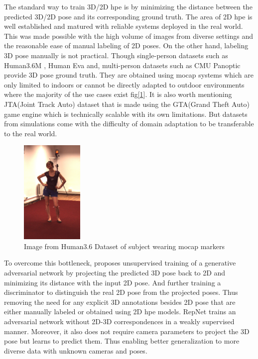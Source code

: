The standard way to train 3D/2D \ac{hpe} is by minimizing the distance between the predicted 3D/2D pose and its corresponding ground truth. The area of 2D \ac{hpe} is well established and matured with reliable systems deployed in the real world. This was made possible with the high volume of images from diverse settings and the reasonable ease of manual labeling of 2D poses. On the other hand, labeling 3D pose manually is not practical. Though single-person datasets such as Human3.6M \cite{H3.6}, Human Eva \cite {HumanEva} and, multi-person datasets such as CMU Panoptic \cite {cmuPanoptic} provide 3D pose ground truth. They are obtained using \ac {mocap} systems which are only limited to indoors or cannot be directly adapted to outdoor environments where the majority of the use cases exist fig[\ref{fig:h36_mocap}]. It is also worth mentioning JTA(Joint Track Auto) dataset \cite{JTA} that is made using the GTA(Grand Theft Auto) game engine which is technically scalable with its own limitations. But datasets from simulations come with the difficulty of domain adaptation to be transferable to the real world.

\begin{figure}[!h]
    \centering
    \includegraphics[width=30mm]{figures/h36/h36_mocap.png}
    \caption{Image from Human3.6 Dataset \cite{H3.6} of subject wearing \ac{mocap} markers}
    \label{fig:h36_mocap}
\end{figure}

To overcome this bottleneck, \cite{unsupervisedAdversarial} proposes unsupervised training of a generative adversarial network by projecting the predicted 3D pose back to 2D and minimizing its distance with the input 2D pose. And further training a discriminator to distinguish the real 2D pose from the projected poses. Thus removing the need for any explicit 3D annotations besides 2D pose that are either manually labeled or obtained using 2D \ac{hpe} models. RepNet \cite{repnet} trains an adversarial network without 2D-3D correspondences in a weakly supervised manner. Moreover, it also does not require camera parameters to project the 3D pose but learns to predict them. Thus enabling better generalization to more diverse data with unknown cameras and poses.

